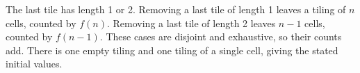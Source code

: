 The last tile has length 1 or 2. Removing a last tile of length 1 leaves a tiling of $n$ cells, counted by $f(n)$. Removing a last tile of length 2 leaves $n-1$ cells, counted by $f(n-1)$. These cases are disjoint and exhaustive, so their counts add. There is one empty tiling and one tiling of a single cell, giving the stated initial values.
